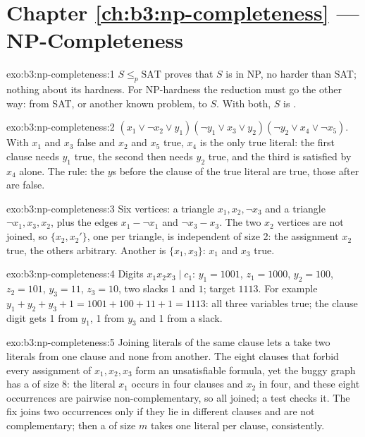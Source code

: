 \section*{Chapter \ref{ch:b3:np-completeness} --- NP-Completeness}

\begin{solution}{exo:b3:np-completeness:1}
$S \le_p \mathrm{SAT}$ proves that $S$ is in NP, no harder than SAT; nothing about its hardness. For NP-hardness the reduction must go the other way: from SAT, or another known  problem, to $S$. With both, $S$ is .
\end{solution}

\begin{solution}{exo:b3:np-completeness:2}
$(x_1 \vee \neg x_2 \vee y_1)(\neg y_1 \vee x_3 \vee y_2)(\neg y_2 \vee x_4 \vee \neg x_5)$. With $x_1$ and $x_3$ false and $x_2$ and $x_5$ true, $x_4$ is the only true literal: the first clause needs $y_1$ true, the second then needs $y_2$ true, and the third is satisfied by $x_4$ alone. The rule: the $y$s before the clause of the true literal are true, those after are false.
\end{solution}

\begin{solution}{exo:b3:np-completeness:3}
Six vertices: a triangle $x_1, x_2, \neg x_3$ and a triangle $\neg x_1, x_3, x_2$, plus the edges $x_1 - \neg x_1$ and $\neg x_3 - x_3$. The two $x_2$ vertices are not joined, so $\{x_2, x_2'\}$, one per triangle, is independent of size 2: the assignment $x_2$ true, the others arbitrary. Another is $\{x_1, x_3\}$: $x_1$ and $x_3$ true.
\end{solution}

\begin{solution}{exo:b3:np-completeness:4}
Digits $x_1 x_2 x_3 \mid c_1$: $y_1 = 1001$, $z_1 = 1000$, $y_2 = 100$, $z_2 = 101$, $y_3 = 11$, $z_3 = 10$, two slacks $1$ and $1$; target $1113$. For example $y_1 + y_2 + y_3 + 1 = 1001 + 100 + 11 + 1 = 1113$: all three variables true; the clause digit gets 1 from $y_1$, 1 from $y_3$ and 1 from a slack.
\end{solution}

\begin{solution}{exo:b3:np-completeness:5}
Joining literals of the same clause lets a  take two literals from one clause and none from another. The eight clauses that forbid every assignment of $x_1, x_2, x_3$ form an unsatisfiable formula, yet the buggy graph has a  of size 8: the literal $x_1$ occurs in four clauses and $x_2$ in four, and these eight occurrences are pairwise non-complementary, so all joined; a test checks it. The fix joins two occurrences only if they lie in different clauses and are not complementary; then a  of size $m$ takes one literal per clause, consistently.
\end{solution}

